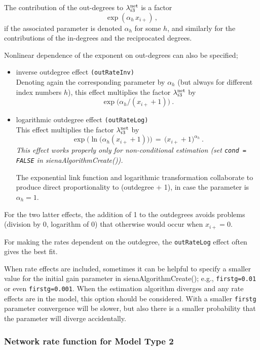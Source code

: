 \documentclass[a4paper,fleqn,11pt]{article}
\newcommand{\+}{\, + \,}
\newcommand{\sfn}[1]{\textsf{#1}}
\begin{document}
\begin{enumerate}
The contribution of the out-degrees to $\lambda^{\rm net}_{i3}$
is a factor
 \[ \exp( \alpha_h \, x_{i+})\,, \]
if the associated parameter is denoted $\alpha_h$ for some $h$,
and similarly for the contributions of the in-degrees and the
reciprocated degrees.

 Nonlinear dependence of the exponent on out-degrees
 can also be specified;
 \begin{itemize}
 \item inverse outdegree effect  \texttt{(outRateInv)} \\
 Denoting again the corresponding parameter by $\alpha_h$
 (but always for different index numbers $h$),
 this effect multiplies the factor $\lambda^{\rm net}_{i3}$ by
 \[ \exp\big( \alpha_h / (x_{i+} +1)\big) \ . \]
 \item logarithmic outdegree effect  \texttt{(outRateLog)} \\
 This effect multiplies the factor $\lambda^{\rm net}_{i3}$ by
 \[ \exp\Big( \ln\big(\alpha_h (x_{i+} +1)\big)\Big) \,=\,
                 \big(x_{i+} +1\big)^{\alpha_h} \ . \]
 \emph{This effect works properly only for non-conditional estimation
    (set \texttt{cond = FALSE} in \sfn{sienaAlgorithmCreate()}).  }


 The exponential link function and logarithmic transformation collaborate
 to produce direct proportionality to (outdegree + 1), in case
 the parameter is $\alpha_h=1$.
 \end{itemize}
 For the two latter effects, the addition of 1 to the outdegrees avoids
 problems (division by 0, logarithm of 0) that otherwise would occur
 when $ x_{i+} = 0$.

 For making the rates dependent on the outdegree,
 the \texttt{outRateLog} effect often gives the best fit.
\end{enumerate}

When rate effects are included, sometimes it can be helpful to specify
a smaller value for the initial gain parameter in \sfn{sienaAlgorithmCreate()};
e.g., \texttt{firstg=0.01} or even  \texttt{firstg=0.001}.
When the estimation algorithm diverges and any rate effects are in the model,
this option should be considered.
With a smaller \texttt{firstg} parameter convergence will be slower, but also
there is a smaller probability that the parameter will diverge accidentally.

\iffalse
\subsubsection{Network rate function for Model Type 2}
\end{document}
